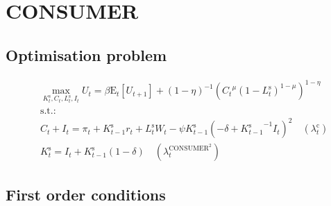 

\section{CONSUMER}

\subsection{Optimisation problem}

\begin{align}
&\max_{K^{\mathrm{s}}_{t}, C_{t}, L^{\mathrm{s}}_{t}, I_{t}
} U_{t} = {\beta} {\mathrm{E}_{t}\left[U_{t+1}\right]} + \left(1 - \eta\right)^{-1} {\left({{C_{t}}^{\mu}} {\left(1 - L^{\mathrm{s}}_{t}\right)^{1 - \mu}}\right)^{1 - \eta}}\\
&\mathrm{s.t.:}\nonumber\\
& C_{t} + I_{t} = \pi_{t} + {K^{\mathrm{s}}_{t-1}} {r_{t}} + {L^{\mathrm{s}}_{t}} {W_{t}} - {\psi} {K^{\mathrm{s}}_{t-1}} \left(-\delta + {K^{\mathrm{s}}_{t-1}}^{-1} {I_{t}}\right)^{2} \quad \left(\lambda^{\mathrm{c}}_{t}\right)\\
& K^{\mathrm{s}}_{t} = I_{t} + {K^{\mathrm{s}}_{t-1}} \left(1 - \delta\right) \quad \left(\lambda^{\mathrm{CONSUMER}^{\mathrm{2}}}_{t}\right)
\end{align}


\subsection{First order conditions}

